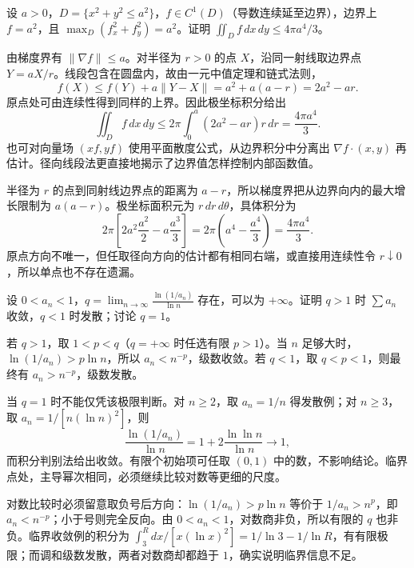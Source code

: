 \documentclass[UTF8,12pt,a4paper,fontset=fandol]{ctexart}
\begin{document}
\begin{example}\label{nm-final9-6}
设 $a>0$，$D=\{x^2+y^2\leq a^2\}$，$f\in C^1(D)$（导数连续延至边界），边界上 $f=a^2$，且 $\max_D(f_x^2+f_y^2)=a^2$。证明 $\displaystyle\iint_D f\,dx\,dy\leq4\pi a^4/3$。
\end{example}
\begin{solve}
由梯度界有 $\|\nabla f\|\leq a$。对半径为 $r>0$ 的点 $X$，沿同一射线取边界点 $Y=aX/r$。线段包含在圆盘内，故由一元中值定理和链式法则，
\[
 f(X)\leq f(Y)+a\|Y-X\|=a^2+a(a-r)=2a^2-ar.
\]
原点处可由连续性得到同样的上界。因此极坐标积分给出
\[
 \iint_D f\,dx\,dy\leq2\pi\int_0^a(2a^2-ar)r\,dr
 =\frac{4\pi a^4}{3}.
\]
也可对向量场 $(xf,yf)$ 使用平面散度公式，从边界积分中分离出 $\nabla f\cdot(x,y)$ 再估计。径向线段法更直接地揭示了边界值怎样控制内部函数值。

半径为 $r$ 的点到同射线边界点的距离为 $a-r$，所以梯度界把从边界向内的最大增长限制为 $a(a-r)$。极坐标面积元为 $r\,dr\,d\theta$，具体积分为
\[
2\pi\left[2a^2\frac{a^2}{2}-a\frac{a^3}{3}\right]
=2\pi\left(a^4-\frac{a^4}{3}\right)=\frac{4\pi a^4}{3}.
\]
原点方向不唯一，但任取径向方向的估计都有相同右端，或直接用连续性令 $r\downarrow0$，所以单点也不存在遗漏。

\end{solve}

\begin{example}\label{nm-final9-7}
设 $0<a_n<1$，$\displaystyle q=\lim_{n\to\infty}\frac{\ln(1/a_n)}{\ln n}$ 存在，可以为 $+\infty$。证明 $q>1$ 时 $\sum a_n$ 收敛，$q<1$ 时发散；讨论 $q=1$。
\end{example}
\begin{solve}
若 $q>1$，取 $1<p<q$（$q=+\infty$ 时任选有限 $p>1$）。当 $n$ 足够大时，$\ln(1/a_n)>p\ln n$，所以 $a_n<n^{-p}$，级数收敛。若 $q<1$，取 $q<p<1$，则最终有 $a_n>n^{-p}$，级数发散。

当 $q=1$ 时不能仅凭该极限判断。对 $n\geq2$，取 $a_n=1/n$ 得发散例；对 $n\geq3$，取 $a_n=1/[n(\ln n)^2]$，则
\[
 \frac{\ln(1/a_n)}{\ln n}=1+2\frac{\ln\ln n}{\ln n}\to1,
\]
而积分判别法给出收敛。有限个初始项可任取 $(0,1)$ 中的数，不影响结论。临界点处，主导幂次相同，必须继续比较对数等更细的尺度。

对数比较时必须留意取负号后方向：$\ln(1/a_n)>p\ln n$ 等价于 $1/a_n>n^p$，即 $a_n<n^{-p}$；小于号则完全反向。由 $0<a_n<1$，对数商非负，所以有限的 $q$ 也非负。临界收敛例的积分为 $\int_3^Rdx/[x(\ln x)^2]=1/\ln3-1/\ln R$，有有限极限；而调和级数发散，两者对数商却都趋于 $1$，确实说明临界信息不足。

\end{solve}
\end{document}
